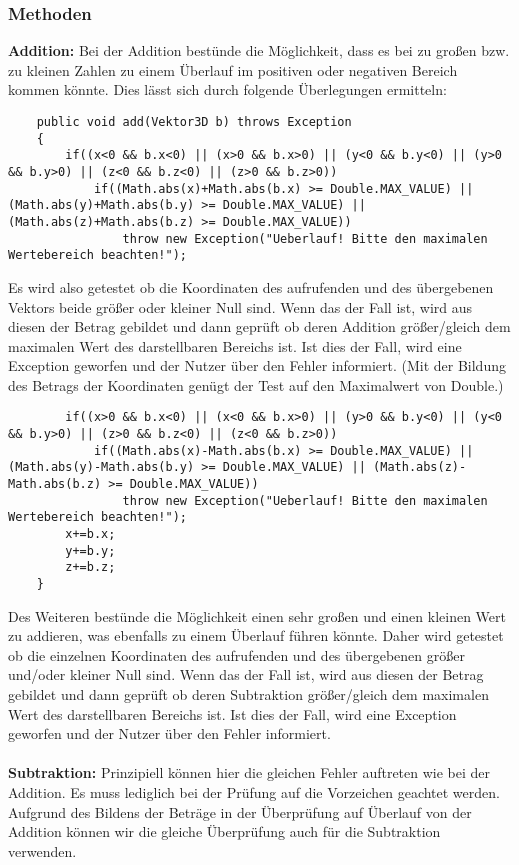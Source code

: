 \documentclass[a4paper,11pt]{scrartcl}
\begin{document}
\subsubsection{Methoden}
\textbf{Addition:}  Bei der Addition bestünde die Möglichkeit, dass es bei zu großen bzw. zu kleinen Zahlen zu einem Überlauf im positiven oder negativen Bereich kommen könnte. Dies lässt sich durch folgende Überlegungen ermitteln:
\begin{lstlisting}
	public void add(Vektor3D b) throws Exception
	{
		if((x<0 && b.x<0) || (x>0 && b.x>0) || (y<0 && b.y<0) || (y>0 && b.y>0) || (z<0 && b.z<0) || (z>0 && b.z>0))
			if((Math.abs(x)+Math.abs(b.x) >= Double.MAX_VALUE) || (Math.abs(y)+Math.abs(b.y) >= Double.MAX_VALUE) || (Math.abs(z)+Math.abs(b.z) >= Double.MAX_VALUE))
				throw new Exception("Ueberlauf! Bitte den maximalen Wertebereich beachten!");
\end{lstlisting}
Es wird also getestet ob die Koordinaten des aufrufenden und des übergebenen Vektors beide größer oder kleiner Null sind. Wenn das der Fall ist, wird aus diesen der Betrag gebildet und dann geprüft ob deren Addition größer/gleich dem maximalen Wert des darstellbaren Bereichs ist. Ist dies der Fall, wird eine Exception geworfen und der Nutzer über den Fehler informiert.
(Mit der Bildung des Betrags der Koordinaten genügt der Test auf den Maximalwert von Double.)
\begin{lstlisting}		
		if((x>0 && b.x<0) || (x<0 && b.x>0) || (y>0 && b.y<0) || (y<0 && b.y>0) || (z>0 && b.z<0) || (z<0 && b.z>0))
			if((Math.abs(x)-Math.abs(b.x) >= Double.MAX_VALUE) || (Math.abs(y)-Math.abs(b.y) >= Double.MAX_VALUE) || (Math.abs(z)-Math.abs(b.z) >= Double.MAX_VALUE))
				throw new Exception("Ueberlauf! Bitte den maximalen Wertebereich beachten!");
		x+=b.x;
		y+=b.y;
		z+=b.z;
	}
\end{lstlisting}
Des Weiteren bestünde die Möglichkeit einen sehr großen und einen kleinen Wert zu addieren, was ebenfalls zu einem Überlauf führen könnte. Daher wird getestet ob die einzelnen Koordinaten des aufrufenden und des übergebenen größer und/oder kleiner Null sind. Wenn das der Fall ist, wird aus diesen der Betrag gebildet und dann geprüft ob deren Subtraktion größer/gleich dem maximalen Wert des darstellbaren Bereichs ist. Ist dies der Fall, wird eine Exception geworfen und der Nutzer über den Fehler informiert.\\
\\
\textbf{Subtraktion:} Prinzipiell können hier die gleichen Fehler auftreten wie bei der Addition. Es muss lediglich bei der Prüfung auf die Vorzeichen geachtet werden. Aufgrund des Bildens der Beträge in der Überprüfung auf Überlauf von der Addition können wir die gleiche Überprüfung auch für die Subtraktion verwenden.\\
\end{document}
